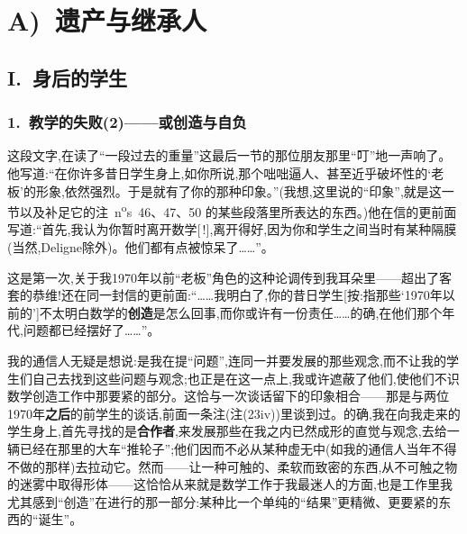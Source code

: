 \providecommand{\fnoteplainbody}[3]{%
  \begingroup\renewcommand{\thefootnote}{#1#2}\footnotemark
  \renewcommand{\thefootnote}{#1}\footnotetext{#3}\endgroup
}

\chapter{A)~遗产与继承人}

\section{I.~身后的学生}

\subsection{1.~教学的失败(2)——或创造与自负}


\pmark{} 这段文字,在读了“一段过去的重量”这最后一节的那位朋友那里“叮”地一声响了。他写道:“在你许多昔日学生身上,如你所说,那个咄咄逼人、甚至近乎破坏性的‘老板’的形象,依然强烈。于是就有了你的那种印象。”(我想,这里说的“印象”,就是这一节以及补足它的注~n\textsuperscript{o}s~46、47、50 的某些段落里所表达的东西。)他在信的更前面写道:“首先,我认为你暂时离开数学[\,!],离开得好,因为你和学生之间当时有某种隔膜(当然,Deligne除外)。他们都有点被惊呆了……”。

这是第一次,关于我1970年以前“老板”角色的这种论调传到我耳朵里——超出了客套的恭维!还在同一封信的更前面:“……我明白了,你的昔日学生[按:指那些‘1970年以前的’]不太明白数学的\textbf{创造}是怎么回事,而你或许有一份责任……的确,在他们那个年代,问题都已经摆好了……”。

我的通信人无疑是想说:是我在提“问题”,连同一并要发展的那些观念,而不让我的学生们自己去找到这些问题与观念;也正是在这一点上,我或许遮蔽了他们,使他们不识数学创造工作中那要紧的部分。这恰与一次谈话留下的印象相合\dmark{}——那是与两位1970年\textbf{之后}的前学生的谈话,前面一条注(注(23iv))里谈到过。的确,我在向我走来的学生身上,首先寻找的是\textbf{合作者},来发展那些在我之内已然成形的直觉与观念,去给一辆已经在那里的大车“推轮子”;他们因而不必从某种虚无中(如我的通信人当年不得不做的那样)去拉动它。然而——让一种可触的、柔软而致密的东西,从不可触之物的迷雾中取得形体——这恰恰从来就是数学工作于我最迷人的方面,也是工作里我尤其感到“创造”在进行的那一部分:某种比一个单纯的“结果”更精微、更要紧的东西的“诞生”。

